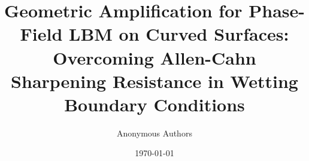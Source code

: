 \documentclass[aip,reprint,numerical,floatfix]{revtex4-2}
\begin{document}
\title{Geometric Amplification for Phase-Field LBM on Curved Surfaces: \\
Overcoming Allen-Cahn Sharpening Resistance in Wetting Boundary Conditions}

\author{Anonymous Authors}

\date{\today}

\maketitle








\appendix




\end{document}
